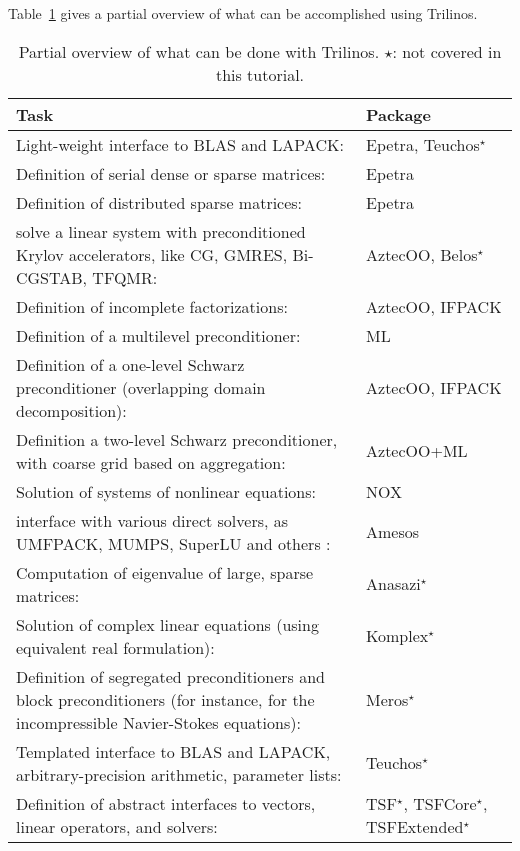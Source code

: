 Table~\ref{tab:tripackages} gives a partial overview of what can be
accomplished using Trilinos.
\begin{table}[htbp]
  \centering
  \begin{tabular}{| p{10cm} | p{3cm} |}
    \hline
    {\bf Task} & {\bf Package} \\
    \hline
    Light-weight interface to BLAS and LAPACK: & Epetra, Teuchos$^\star$ \\\hline
    Definition of serial dense or sparse matrices: & Epetra \\\hline
    Definition of distributed sparse matrices:& Epetra \\\hline
    solve a linear system with preconditioned Krylov accelerators, like
    CG, GMRES, Bi-CGSTAB, TFQMR:& AztecOO, Belos$^\star$ \\\hline
    Definition of incomplete factorizations:& AztecOO, \newline IFPACK \\\hline
    Definition of a multilevel preconditioner:& ML \\\hline
    Definition of a one-level Schwarz preconditioner (overlapping domain
    decomposition):& AztecOO, \newline IFPACK \\\hline
    Definition a two-level Schwarz preconditioner, with coarse grid based on
    aggregation:& AztecOO+ML \\\hline
    Solution of  systems of nonlinear equations:& NOX \\\hline
    interface with various direct solvers, as UMFPACK, MUMPS, SuperLU
    and others :& Amesos \\\hline
    Computation of eigenvalue of large, sparse matrices:& Anasazi$^\star$
    \\\hline
    Solution of complex linear equations (using equivalent real formulation):&
    Komplex$^\star$ \\\hline
    Definition of segregated preconditioners and block preconditioners (for
    instance, for the incompressible Navier-Stokes equations):&
    Meros$^\star$ \\\hline
    Templated interface to BLAS and LAPACK, arbitrary-precision
    arithmetic, parameter lists:& Teuchos$^\star$ \\\hline
    Definition of abstract interfaces to vectors, linear operators, and solvers:& TSF$^\star$, TSFCore$^\star$, TSFExtended$^\star$    \\
    \hline
  \end{tabular}
  \caption{Partial overview of what can be done with Trilinos. $\star$:
    not covered in this tutorial.}
  \label{tab:tripackages}
\end{table}

